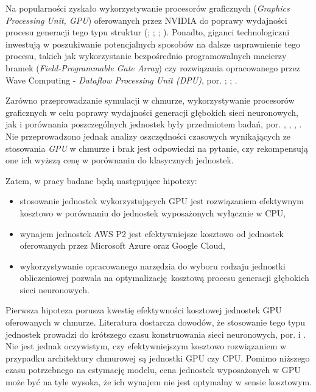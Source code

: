 \documentclass[12pt,a4paper,twoside]{article}
\begin{document}
Na popularności zyskało wykorzystywanie procesorów graficznych (\textit{Graphics Processing Unit, GPU}) oferowanych przez NVIDIA do poprawy wydajności procesu generacji tego typu struktur (\citet{jermain2015}; \citet{litvinenko2014}; \citet{strom2015}; \citet{vanhoucke2011}). Ponadto, giganci technologiczni inwestują w poszukiwanie potencjalnych sposobów na dalsze usprawnienie tego procesu, takich jak wykorzystanie bezpośrednio programowalnych macierzy bramek (\textit{Field-Programmable Gate Array}) czy rozwiązania opracowanego przez Wave Computing - \textit{Dataflow Processing Unit (DPU)}, por. \citet{gysel2016}; \citet{chen2016}; \citet{han2016}.

Zarówno przeprowadzanie symulacji w chmurze, wykorzystywanie procesorów graficznych w celu poprawy wydajności generacji głębokich sieci neuronowych, jak i porównania poszczególnych jednostek były przedmiotem badań, por. \citet{calheiros2010}, \citet{github2017}, \citet{medium2017b}, \citet{hackernoon2017}. Nie przeprowadzono jednak analizy oszczędności czasowych wynikających ze stosowania \textit{GPU} w chmurze i brak jest odpowiedzi na pytanie, czy rekompensują one ich wyższą cenę w porównaniu do klasycznych jednostek.

Zatem, w pracy badane będą następujące hipotezy:
\begin{itemize}
\item stosowanie jednostek wykorzystujących GPU jest rozwiązaniem efektywnym kosztowo  w porównaniu do jednostek wyposażonych wyłącznie w CPU,
\item wynajem jednostek AWS P2 jest efektywniejsze kosztowo od jednostek oferowanych przez Microsoft Azure oraz Google Cloud,
\item wykorzystywanie opracowanego narzędzia do wyboru rodzaju jednostki obliczeniowej pozwala na optymalizację kosztową procesu generacji głębokich sieci neuronowych.
\end{itemize}

Pierwsza hipoteza porusza kwestię efektywności kosztowej jednostek GPU oferowanych w chmurze. Literatura dostarcza dowodów, że stosowanie tego typu jednostek prowadzi do krótszego czasu konstruowania sieci neuronowych, por. \citet{jermain2015} i \citet{litvinenko2014}. Nie jest jednak oczywistym, czy efektywniejszym kosztowo rozwiązaniem w przypadku architektury chmurowej są jednostki GPU czy CPU. Pomimo niższego czasu potrzebnego na estymację modelu, cena jednostek wyposażonych w GPU może być na tyle wysoka, że ich wynajem nie jest optymalny w sensie kosztowym.
\end{document}
